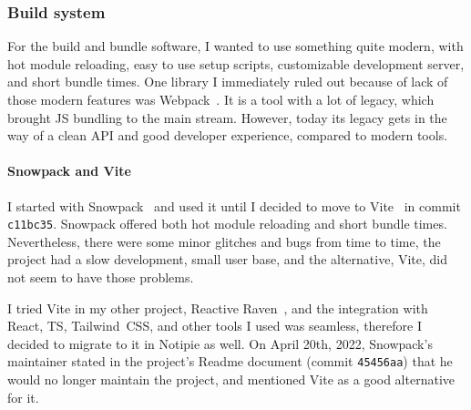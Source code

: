 \subsubsection{Build system}\label{sec:build-system}

For the build and bundle software,
I wanted to use something quite modern,
with hot module reloading,
easy to use setup scripts,
customizable development server,
and short bundle times.
One library I immediately ruled out
because of lack of those modern features
was Webpack~\cite{koppers_webpack_2022}.
It is a tool with a lot of legacy,
which brought \ac{JS} bundling to the main stream.
However, today its legacy gets in the way
of a clean \ac{API} and good developer experience,
compared to modern tools.

\paragraph*{Snowpack and Vite}\label{sec:snowpack-and-vite}

I started with Snowpack~\cite{schott_snowpack_2021}
and used it until I decided to move to Vite~\cite{you_vite_2022}
in commit \texttt{c11bc35}.
Snowpack offered both hot module reloading and short bundle times.
Nevertheless,
there were some minor glitches and bugs from time to time,
the project had a slow development,
small user base,
and the alternative, Vite,
did not seem to have those problems.

I tried Vite in my other project,
Reactive Raven~\cite{sewera_reactive_2022},
and the integration with
React,
\ac{TS},
Tailwind~CSS,
and other tools I used was seamless,
therefore I decided to migrate to it in Notipie as well.
On April 20th, 2022,
Snowpack's maintainer stated in the project's Readme document
(commit \texttt{45456aa})
that he would no longer maintain the project,
and mentioned Vite as a good alternative for it.

